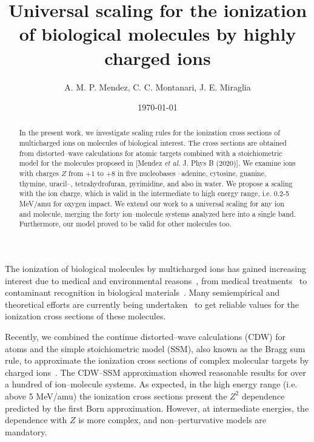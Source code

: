 \documentclass[10pt,showpacs,showkeys,twocolumn]{revtex4}
\begin{document}
\title[Universal scaling for the ionization of biological molecules]{
Universal scaling for the ionization of biological molecules by highly charged ions}
\author{A. M. P. Mendez, C. C. Montanari, J. E. Miraglia}

\date{\today}%

\begin{abstract}
In the present work, we investigate scaling rules for the ionization cross sections of multicharged ions on molecules of biological interest. The cross sections are obtained from distorted--wave calculations for atomic targets combined with a stoichiometric model for the molecules proposed in [Mendez \textit{et al.} J. Phys B (2020)]. We examine ions with charges $Z$ from $+1$ to $+8$ in five nucleobases --adenine, cytosine, guanine, thymine, uracil--, tetrahydrofuran, pyrimidine, and also in water. We propose a scaling with the ion charge, which is valid in the intermediate to high energy range, i.e. 0.2-5 MeV/amu for oxygen impact. We extend our work to a universal scaling for any ion and molecule, merging the forty ion--molecule systems analyzed here into a single band. Furthermore, our model proved to be valid for other molecules too.  
\end{abstract}


\maketitle


The ionization of biological molecules by multicharged ions has gained 
increasing interest due to medical and environmental 
reasons~\cite{PhysMed}, from medical treatments~\cite{Mohamad2017,
Solov2009,Denifl2011} to contaminant recognition in biological 
materials~\cite{water,ferrazdias}. Many semiempirical 
\citep{vera_prl2013} and theoretical efforts are currently being 
undertaken~\cite{MendezJPB20,Quinto20,ludde2019,ludde2018,ludde2016,
Champion2012} to get reliable values for the ionization cross sections 
of these molecules. 

Recently, we combined the continue distorted--wave calculations (CDW) 
for atoms and the simple stoichiometric model (SSM), also known as the 
Bragg sum rule, to approximate the ionization cross sections of complex 
molecular targets by charged ions~\cite{MendezJPB20}. The CDW--SSM 
approximation showed reasonable results for over a hundred of 
ion--molecule systems. As expected, in the high energy range (i.e. 
above 5 MeV/amu) the ionization cross sections  present the $Z^2$ 
dependence predicted by the first Born approximation. However, at 
intermediate energies, the dependence with $Z$ is more complex, and 
non--perturvative models are mandatory.  
\end{document}
